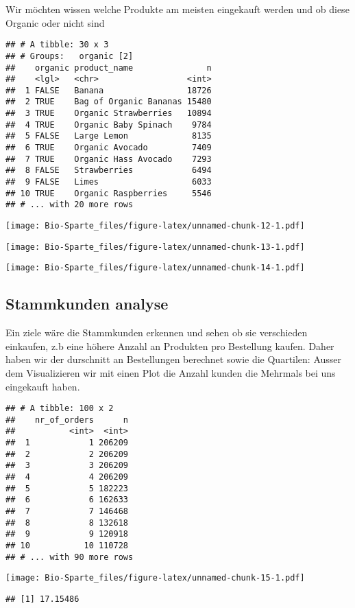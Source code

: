 \documentclass[]{article}
\begin{document}
Wir möchten wissen welche Produkte am meisten eingekauft werden und ob
diese Organic oder nicht sind

\begin{verbatim}
## # A tibble: 30 x 3
## # Groups:   organic [2]
##    organic product_name               n
##    <lgl>   <chr>                  <int>
##  1 FALSE   Banana                 18726
##  2 TRUE    Bag of Organic Bananas 15480
##  3 TRUE    Organic Strawberries   10894
##  4 TRUE    Organic Baby Spinach    9784
##  5 FALSE   Large Lemon             8135
##  6 TRUE    Organic Avocado         7409
##  7 TRUE    Organic Hass Avocado    7293
##  8 FALSE   Strawberries            6494
##  9 FALSE   Limes                   6033
## 10 TRUE    Organic Raspberries     5546
## # ... with 20 more rows
\end{verbatim}

\texttt{[image: Bio-Sparte\_files/figure-latex/unnamed-chunk-12-1.pdf]}

\texttt{[image: Bio-Sparte\_files/figure-latex/unnamed-chunk-13-1.pdf]}

\texttt{[image: Bio-Sparte\_files/figure-latex/unnamed-chunk-14-1.pdf]}

\hypertarget{stammkunden-analyse}{%
\subsection{Stammkunden analyse}\label{stammkunden-analyse}}

Ein ziele wäre die Stammkunden erkennen und sehen ob sie verschieden
einkaufen, z.b eine höhere Anzahl an Produkten pro Bestellung kaufen.
Daher haben wir der durschnitt an Bestellungen berechnet sowie die
Quartilen: Ausser dem Visualizieren wir mit einen Plot die Anzahl kunden
die Mehrmals bei uns eingekauft haben.

\begin{verbatim}
## # A tibble: 100 x 2
##    nr_of_orders      n
##           <int>  <int>
##  1            1 206209
##  2            2 206209
##  3            3 206209
##  4            4 206209
##  5            5 182223
##  6            6 162633
##  7            7 146468
##  8            8 132618
##  9            9 120918
## 10           10 110728
## # ... with 90 more rows
\end{verbatim}

\texttt{[image: Bio-Sparte\_files/figure-latex/unnamed-chunk-15-1.pdf]}

\begin{verbatim}
## [1] 17.15486
\end{verbatim}
\end{document}
